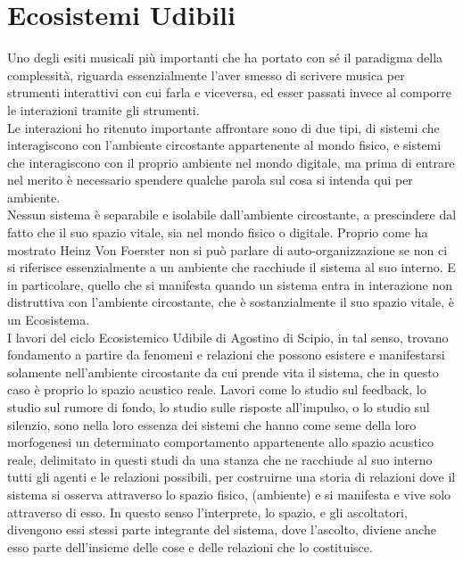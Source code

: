 \section{Ecosistemi Udibili}
\label{sec:Ecosistemi Udibili}

Uno degli esiti musicali più importanti che ha portato con sé 
il paradigma della complessità, riguarda essenzialmente l'aver smesso di 
scrivere musica per strumenti interattivi con cui farla e viceversa, 
ed esser passati invece al  comporre le interazioni tramite gli strumenti. \\
Le interazioni ho ritenuto importante affrontare sono di due tipi, 
di sistemi che interagiscono con l’ambiente circostante appartenente al mondo fisico, 
e sistemi che interagiscono con il proprio ambiente nel mondo digitale, 
ma prima di entrare nel merito è necessario spendere qualche parola sul cosa
si intenda qui per ambiente. \\
Nessun sistema è separabile e isolabile dall'ambiente circostante, 
a prescindere dal fatto che il suo spazio vitale, sia nel mondo fisico o digitale. 
Proprio come ha mostrato Heinz Von Foerster non si può parlare di auto-organizzazione
se non ci si riferisce essenzialmente a un ambiente che racchiude il sistema al suo interno. 
E in particolare, quello che si manifesta quando un sistema entra in interazione non distruttiva 
con l'ambiente circostante, che è sostanzialmente il suo spazio vitale, è un Ecosistema. \\
I lavori del ciclo Ecosistemico Udibile di Agostino di Scipio, in tal senso, 
trovano fondamento a partire da fenomeni e relazioni che possono esistere e manifestarsi solamente nell'ambiente circostante da cui prende vita il sistema, 
che in questo caso è proprio lo spazio acustico reale. 
Lavori come lo studio sul feedback, lo studio sul rumore di fondo, lo studio sulle risposte all'impulso, o
lo studio sul silenzio, sono nella loro essenza dei sistemi che hanno come seme 
della loro morfogenesi un determinato 
comportamento appartenente allo spazio acustico reale, delimitato in questi studi da una stanza
che ne racchiude al suo interno tutti gli agenti e le relazioni possibili,
per costruirne una storia di relazioni dove il sistema si osserva attraverso lo spazio fisico, 
(ambiente) e si manifesta e vive solo attraverso di esso.
In questo senso l’interprete, lo spazio, e gli ascoltatori, 
divengono essi stessi parte integrante del sistema, dove l’ascolto, diviene anche esso
parte dell’insieme delle cose e delle relazioni che lo costituisce. \\

